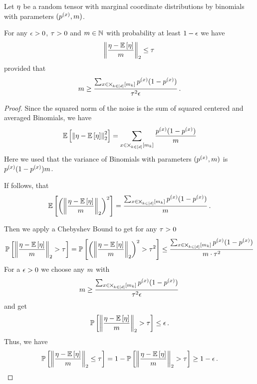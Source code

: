 \begin{theorem}\label{the:sphereBoundVariance}
	Let $\eta$ be a random tensor with marginal coordinate distributions by binomials with parameters $(p^{(x)},m)$.

	For any $\epsilon>0$, $\tau>0$ and $m\in\mathbb{N}$ with probability at least $1-\epsilon$ we have
		\[ \left\|\frac{\eta-\mathbb{E}\left[\eta\right]}{m}\right\|_{2} \leq   \tau \, \]
	provided that
		\[ m \geq  \frac{ \sum_{x\in\bigtimes_{k\in[d]}[m_{k}]} p^{(x)}(1-p^{(x)})}{\tau^2 \epsilon} \, . \]
\end{theorem}
\begin{proof}
	Since the squared norm of the noise is the sum of squared centered and averaged Binomials, we have
		\[  \mathbb{E}\left[\left\|\eta-\mathbb{E}\left[\eta\right]\right\|_{2}^2\right]  
		= \sum_{x\in\bigtimes_{k\in[d]}[m_{k}]} \frac{p^{(x)}(1-p^{(x)})}{m} \]
	Here we used that the variance of Binomials with parameters $(p^{(x)},m)$ is $p^{(x)}(1-p^{(x)}) m$.
	
	If follows, that 
		\[ \mathbb{E}\left[\left(\left\|\frac{\eta-\mathbb{E}\left[\eta\right]}{m}\right\|_{2}\right)^2\right] =  \frac{ \sum_{x\in\bigtimes_{k\in[d]}[m_{k}]} p^{(x)}(1-p^{(x)})}{m} \, . \]
	
	Then we apply a Chebyshev Bound to get for any $\tau>0$
	\begin{align}
		\mathbb{P}\left[\left\|\frac{\eta-\mathbb{E}\left[\eta\right]}{m}\right\|_{2} > \tau\right]
		= \mathbb{P}\left[\left(\left\|\frac{\eta-\mathbb{E}\left[\eta\right]}{m}\right\|_{2}\right)^2 > \tau^2\right]
		\leq \frac{ \sum_{x\in\bigtimes_{k\in[d]}[m_{k}]} p^{(x)}(1-p^{(x)})}{m \cdot \tau^2}
	\end{align} 
	For a $\epsilon>0$ we choose any $m$ with
		\[ m \geq  \frac{ \sum_{x\in\bigtimes_{k\in[d]}[m_{k}]} p^{(x)}(1-p^{(x)})}{\tau^2 \epsilon} \, \]
	and get 
	\begin{align}
		\mathbb{P}\left[\left\|\frac{\eta-\mathbb{E}\left[\eta\right]}{m}\right\|_{2} > \tau\right] \leq \epsilon \, .
	\end{align} 
	Thus, we have 
	\begin{align}
		\mathbb{P}\left[\left\|\frac{\eta-\mathbb{E}\left[\eta\right]}{m}\right\|_{2} \leq \tau\right] = 1 - \mathbb{P}\left[\left\|\frac{\eta-\mathbb{E}\left[\eta\right]}{m}\right\|_{2} > \tau\right]  \geq 1-\epsilon \, .
	\end{align} 
\end{proof}


